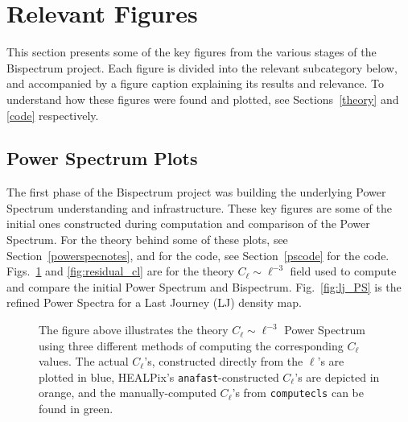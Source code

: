 \documentclass[11pt]{article}
\renewcommand{\_}[1]{\underline{ #1 }}
\newcommand{\us}{\textunderscore}
\begin{document}
{\section{Relevant Figures}\label{relevant_figures}

This section presents some of the key figures from the various stages of the Bispectrum project. Each figure is divided into the relevant subcategory below, and accompanied by a figure caption explaining its results and relevance. To understand how these figures were found and plotted, see Sections~\ref{theory} and \ref{code} respectively.

\subsection{Power Spectrum Plots}\label{psplots}

The first phase of the Bispectrum project was building the underlying Power Spectrum understanding and infrastructure. These key figures are some of the initial ones constructed during computation and comparison of the Power Spectrum. For the theory behind some of these plots, see Section~\ref{powerspecnotes}, and for the code, see Section~\ref{pscode} for the code. Figs.~\ref{fig:theory_l3_PS} and \ref{fig:residual_cl} are for the theory $C_{\ell} \sim \ell^{-3}$ field used to compute and compare the initial Power Spectrum and Bispectrum. Fig.~\ref{fig:lj_PS} is the refined Power Spectra for a Last Journey (LJ) density map.

\begin{figure}[H]
    \centering
    \caption{The figure above illustrates the theory $C_{\ell} \sim \ell^{-3}$ Power Spectrum using three different methods of computing the corresponding $C_{\ell}$ values. The actual $C_{\ell}$'s, constructed directly from the $\ell$'s are plotted in blue, HEALPix's \texttt{anafast}-constructed $C_{\ell}$'s are depicted in orange, and the manually-computed $C_{\ell}$'s from \texttt{compute\us cls} can be found in green.}\label{fig:theory_l3_PS}
\end{figure}

}
\end{document}
